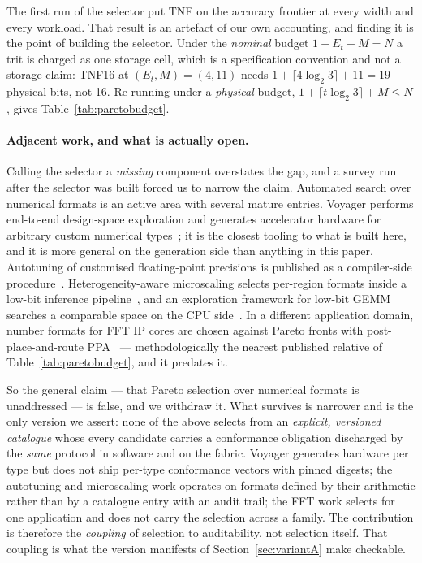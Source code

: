 \documentclass[11pt]{article}
\theoremstyle{definition}
\begin{document}
The first run of the selector put TNF on the accuracy frontier at every width and
every workload. That result is an artefact of our own accounting, and finding it
is the point of building the selector. Under the \emph{nominal} budget
$1 + E_t + M = N$ a trit is charged as one storage cell, which is a specification
convention and not a storage claim: TNF16 at $(E_t,M) = (4,11)$ needs
$1 + \lceil 4\log_2 3\rceil + 11 = 19$ physical bits, not 16. Re-running under a
\emph{physical} budget, $1 + \lceil t\log_2 3\rceil + M \le N$, gives
Table~\ref{tab:paretobudget}.

\paragraph{Adjacent work, and what is actually open.}
Calling the selector a \emph{missing} component overstates the gap, and a survey
run after the selector was built forced us to narrow the claim. Automated search
over numerical formats is an active area with several mature entries. Voyager
performs end-to-end design-space exploration and generates accelerator hardware
for arbitrary custom numerical types~\cite{prabhu2026voyager}; it is the closest
tooling to what is built here, and it is more general on the generation side than
anything in this paper. Autotuning of customised floating-point precisions is
published as a compiler-side procedure~\cite{chen2026autotuning}. Heterogeneity-aware
microscaling selects per-region formats inside a low-bit inference
pipeline~\cite{ada2026mx}, and an exploration framework for low-bit GEMM searches
a comparable space on the CPU side~\cite{exagemm2026}. In a different application
domain, number formats for FFT IP cores are chosen against Pareto fronts with
post-place-and-route PPA~\cite{fftformats2026} --- methodologically the nearest
published relative of Table~\ref{tab:paretobudget}, and it predates it.

So the general claim --- that Pareto selection over numerical formats is
unaddressed --- is false, and we withdraw it. What survives is narrower and is the
only version we assert: none of the above selects from an \emph{explicit,
versioned catalogue} whose every candidate carries a conformance obligation
discharged by the \emph{same} protocol in software and on the fabric. Voyager
generates hardware per type but does not ship per-type conformance vectors with
pinned digests; the autotuning and microscaling work operates on formats defined
by their arithmetic rather than by a catalogue entry with an audit trail; the FFT
work selects for one application and does not carry the selection across a family.
The contribution is therefore the \emph{coupling} of selection to auditability, not
selection itself. That coupling is what the version manifests of
Section~\ref{sec:variantA} make checkable.
\end{document}
